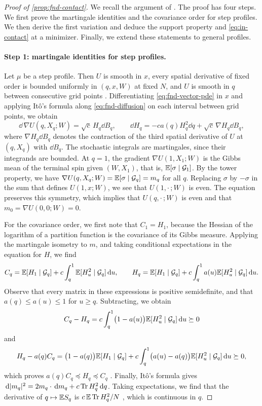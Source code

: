 \begin{proof}[Proof of \cref{prop:fnd-contact}]
We recall the argument of \cite[Proposition~2.1 and Section~2.6]{AL}.
The proof has four steps. We first prove the martingale identities and
the covariance order for step profiles. We then derive the first
variation and deduce the support property and \eqref{eq:in-contact}
at a minimizer. Finally, we extend these statements to general profiles.

\paragraph{Step 1: martingale identities for step profiles.}
Let $\mu$ be a step profile. Then $U$ is smooth in $x$, every spatial
derivative of fixed order is bounded uniformly in $(q,x,W)$ at fixed
$N$, and $U$ is smooth in $q$ between consecutive grid points
\cite[Section~2.6.1]{AL}. Differentiating \eqref{eq:fnd-vector-pde} in
$x$ and applying It\^o's formula along \eqref{eq:fnd-diffusion} on each
interval between grid points, we obtain \cite[(2.5)]{AL}
\[
 \dd\,\nabla U(q,X_q;W)=\sqrt c\,H_q\dd B_q,\qquad
 \dd H_q=-ca(q)H_q^2\dd q+\sqrt c\,\nabla H_q\dd B_q ,
\]
where $\nabla H_q\dd B_q$ denotes the contraction of the third spatial
derivative of $U$ at $(q,X_q)$ with $\dd B_q$. The stochastic integrals are martingales, since their integrands are
bounded. At $q=1$, the
gradient $\nabla U(1,X_1;W)$ is the Gibbs mean of the terminal spin
given $(W,X_1)$, that is, $\mathbb E[\sigma\mid\mathcal G_1]$. By the tower property,
we have $\nabla U(q,X_q;W)=\mathbb E[\sigma\mid\mathcal G_q]=m_q$ for all $q$.
Replacing $\sigma$ by $-\sigma$ in the sum that defines $U(1,x;W)$, we
see that $U(1,\cdot\,;W)$ is even. The equation preserves this symmetry,
which implies
that $U(q,\cdot\,;W)$ is even and that $m_0=\nabla U(0,0;W)=0$.

For the covariance order, we first note that $C_1=H_1$, because the
Hessian of the logarithm of a partition function is the covariance of
its Gibbs measure. Applying the martingale isometry to $m$, and taking
conditional expectations in the equation for $H$, we find
\[
 C_q=\mathbb E[H_1\mid\mathcal G_q]+c\int_q^1\mathbb E[H_u^2\mid\mathcal G_q]\,\mathrm d u,\qquad
 H_q=\mathbb E[H_1\mid\mathcal G_q]+c\int_q^1a(u)\mathbb E[H_u^2\mid\mathcal G_q]\,\mathrm d u .
\]
Observe that every matrix in these expressions is positive
semidefinite, and that $a(q)\le a(u)\le1$ for $u\ge q$. Subtracting, we obtain
\[
 C_q-H_q=c\int_q^1\bigl(1-a(u)\bigr)\mathbb E[H_u^2\mid\mathcal G_q]\,\mathrm d u\succeq0
\]
and
\[
 H_q-a(q)C_q=\bigl(1-a(q)\bigr)\mathbb E[H_1\mid\mathcal G_q]
 +c\int_q^1\bigl(a(u)-a(q)\bigr)\mathbb E[H_u^2\mid\mathcal G_q]\,\mathrm d u\succeq0,
\]
which proves $a(q)C_q\preceq H_q\preceq C_q$ \cite[(2.6)]{AL}. Finally,
It\^o's formula gives $\,\mathrm d|m_q|^2=2m_q\cdot\,\mathrm d m_q+c\operatorname{Tr} H_q^2\,\mathrm d q$.
Taking expectations, we find that the derivative of $q\mapsto\mathbb E S_q$ is
$c\,\mathbb E\operatorname{Tr} H_q^2/N$ \cite[(2.7)]{AL}, which is continuous in $q$.


\end{proof}

